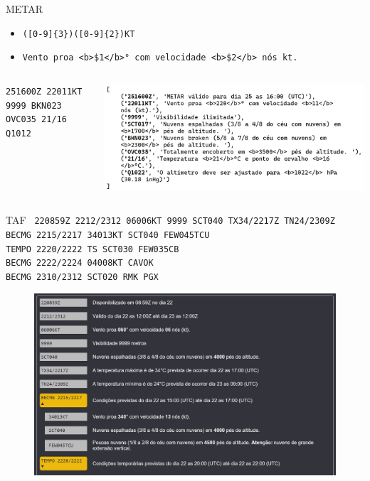 \documentclass{beamer}
\begin{document}
\begin{frame}{METAR}
    \centering
    \begin{itemize}
        \item \texttt{([0-9]\{3\})([0-9]\{2\})KT}
        \item \texttt{Vento proa <b>\$1</b>° com velocidade <b>\$2</b> nós kt.}    
    \end{itemize}
    \begin{minipage}[b]{0.9\linewidth}
        \begin{columns}
            \begin{column}{0.4\textwidth}
                \tiny{\texttt{251600Z 22011KT 9999 BKN023 OVC035 21/16 Q1012}}
            \end{column}
            \begin{column}{0.6\textwidth}
                \includegraphics[width=\linewidth]{img/metar-dec.png}
            \end{column}
        \end{columns}
    \end{minipage}
\end{frame}

\begin{frame}{TAF}
    \footnotesize{\texttt{
220859Z 2212/2312 06006KT 9999 SCT040 TX34/2217Z TN24/2309Z \\
    BECMG 2215/2217 34013KT SCT040 FEW045TCU \\
    TEMPO 2220/2222 TS SCT030 FEW035CB \\
    BECMG 2222/2224 04008KT CAVOK \\
    BECMG 2310/2312 SCT020 RMK PGX}}

  \begin{figure}[ht]
    \begin{center}
    \includegraphics[width=0.65\linewidth]{img/TAF-SBBE.png}
    \label{fig:UI}
    \end{center}
    \end{figure}
\end{frame}
\end{document}
